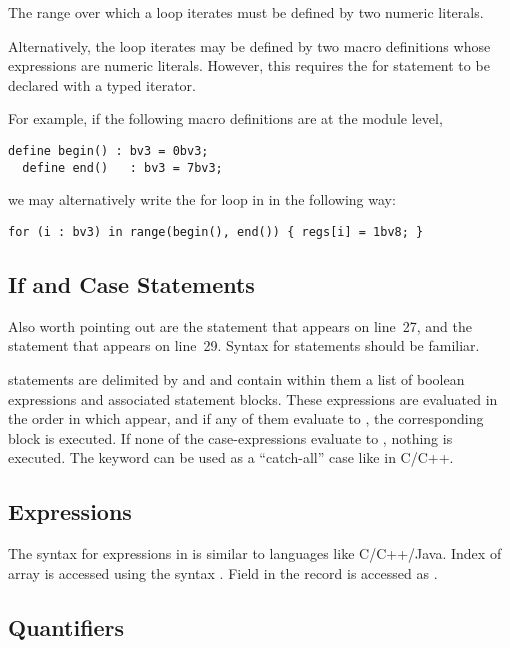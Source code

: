 The range over which a  loop iterates must be defined by two numeric literals.

Alternatively, the loop iterates may be defined by two macro definitions whose expressions are numeric literals. However, this requires the for statement to be declared with a typed iterator.

For example, if the following macro definitions are at the module level,
\begin{lstlisting}[language=uclid,style=uclidstyle]
  define begin() : bv3 = 0bv3;
  define end()   : bv3 = 7bv3;
\end{lstlisting}
we may alternatively write the for loop in  in the following way:
\begin{lstlisting}[language=uclid,style=uclidstyle]
  for (i : bv3) in range(begin(), end()) { regs[i] = 1bv8; }
\end{lstlisting}

\subsection{If and Case Statements}
Also worth pointing out are the  statement that appears on line~27, and the  statement that appears on line~29. Syntax for  statements should be familiar.

 statements are delimited by  and  and contain within them a list of boolean expressions and associated statement blocks. These expressions are evaluated in the order in which appear, and if any of them evaluate to , the corresponding block is executed. If none of the case-expressions evaluate to , nothing is executed. The keyword  can be used as a ``catch-all'' case like in C/C++.

\subsection{Expressions}

The syntax for expressions in \uclid{} is similar to languages like C/C++/Java. Index  of array  is accessed using the syntax . Field  in the record  is accessed as .

\subsection{Quantifiers}

